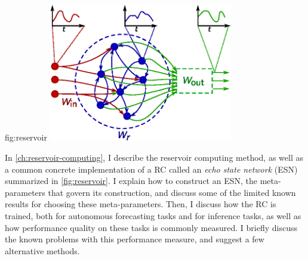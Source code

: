 \begin{reusefigure}{fig:reservoir}
  \includegraphics[width=0.6\textwidth]{figures/reservoir}
  \caption{High-level view of an echo state network RC.  An input
    signal (red, top left) drives an internal reservoir to produce a
    reservoir response (blue, top center) which is then combined to
    form an output signal (green, top right). In an ESN, the reservoir
    network has external input signals (red nodes, left) that drive
    the internal network (blue nodes, center) to produces an overall
    output (green, right).  Each internal node may have two kinds of
    input connections: connections to other nodes in the network
    ($W_r$, blue arrows), or connections to the overall input
    ($W_\text{in}$, red arrows). Each node may also contribute to the
    overall output ($W_\text{out}$, green arrows). Note that the
    internal connections may contain cycles.  When the ESN is used to
    perform forecasting, the output on the right side is connected to
    the input on the left side, allowing the ESN to run autonomously
    with no external input.}%
\end{reusefigure}

In \cref{ch:reservoir-computing}, I describe the reservoir computing
method, as well as a common concrete implementation of a RC called an
\emph{echo state network} (ESN) summarized in \cref{fig:reservoir}. I
explain how to construct an ESN, the meta-parameters that govern its
construction, and discuss some of the limited known results for
choosing these meta-parameters. Then, I discuss how the RC is trained,
both for autonomous forecasting tasks and for inference tasks, as well
as how performance quality on these tasks is commonly measured. I
briefly discuss the known problems with this performance measure, and
suggest a few alternative methods.

